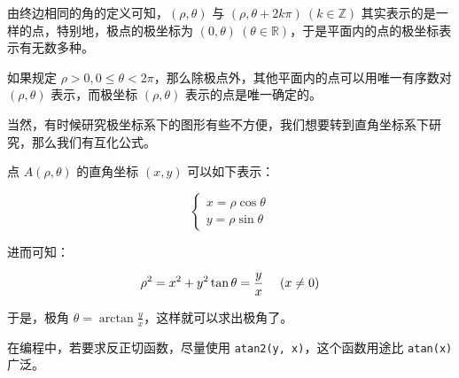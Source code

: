 由终边相同的角的定义可知，$(\rho,\theta)$ 与 $(\rho,\theta+2k\pi)\ (k\in \mathbb{Z})$ 其实表示的是一样的点，特别地，极点的极坐标为 $(0,\theta)\ (\theta\in \mathbb{R})$，于是平面内的点的极坐标表示有无数多种。

如果规定 $\rho>0,0\le \theta<2\pi​$，那么除极点外，其他平面内的点可以用唯一有序数对 $(\rho,\theta)​$ 表示，而极坐标 $(\rho,\theta)​$ 表示的点是唯一确定的。

当然，有时候研究极坐标系下的图形有些不方便，我们想要转到直角坐标系下研究，那么我们有互化公式。

点 $A(\rho,\theta)$ 的直角坐标 $(x,y)$ 可以如下表示：

$$
\begin{cases}
x=\rho \cos \theta\\
y=\rho \sin \theta
\end{cases}
$$

进而可知：

$$
\rho ^2=x^2+y^2\\
\tan \theta=\frac{y}{x}\ \ \ \ (x\not =0)
$$

于是，极角 $\theta=\arctan \frac{y}{x}$，这样就可以求出极角了。

在编程中，若要求反正切函数，尽量使用 \texttt{atan2(y, x)}，这个函数用途比 \texttt{atan(x)} 广泛。
